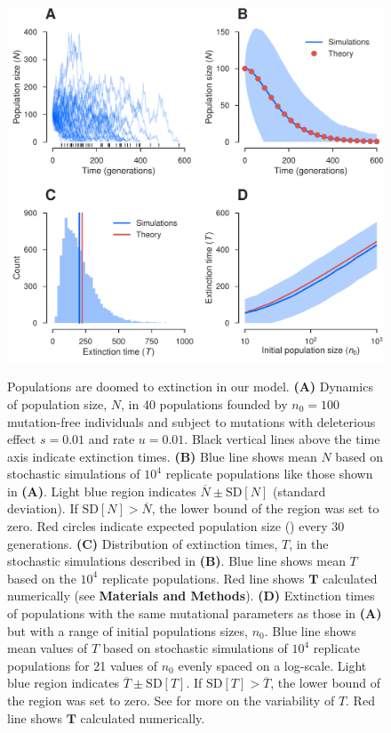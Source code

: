 \documentclass[9pt,lineno]{elife}
\begin{document}
\begin{figure}[ht!]
\includegraphics[width=.67\linewidth]{decay.pdf}
\caption{Populations are doomed to extinction in our model.  
%
\textbf{(A)} Dynamics of population size, $N$, in 40 populations founded by $n_0=100$ mutation-free individuals and subject to mutations with deleterious effect $s=0.01$ and rate $u=0.01$.  Black vertical lines above the time axis indicate extinction times.
%
\textbf{(B)} Blue line shows mean $N$ based on stochastic simulations of $10^4$ replicate populations like those shown in \textbf{(A)}.  
Light blue region indicates $\overline{N} \pm \mathrm{SD}[N]$ (standard deviation). If $\mathrm{SD}[N] > \overline{N}$, the lower bound of the region was set to zero.  
Red circles indicate expected population size () every 30 generations.
%
\textbf{(C)} Distribution of extinction times, $T$, in the stochastic simulations described in \textbf{(B)}. 
Blue line shows mean $T$ based on the $10^4$ replicate populations.  
Red line shows $\mathbf{T}$ calculated numerically (see \textbf{Materials and Methods}).  
%
\textbf{(D)} Extinction times of populations with the same mutational parameters as those in \textbf{(A)} but with a range of initial populations sizes, $n_0$.
%
Blue line shows mean values of $T$ based on stochastic simulations of $10^4$ replicate populations for 21 values of $n_0$ evenly spaced on a log-scale.
%
Light blue region indicates $\overline{T} \pm  \mathrm{SD}[T]$. If $\mathrm{SD}[T] > \overline{T}$, the lower bound of the region was set to zero.  See  for more on the variability of $T$.
%
Red line shows $\mathbf{T}$ calculated numerically.}
\label{fig:decay}
\label{figsupp:sf1}
\end{figure}
\end{document}
